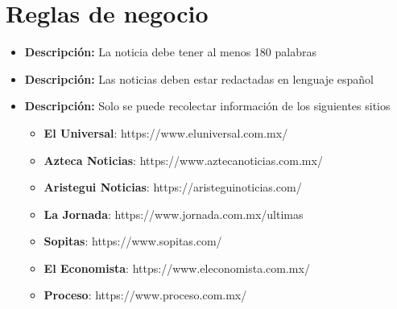 \section{Reglas de negocio}
\begin{itemize}
  \item \textbf{Descripción:}  La noticia debe tener al menos 180 palabras
\end{itemize}


\begin{itemize}
  \item \textbf{Descripción:} Las noticias deben estar redactadas en lenguaje español
\end{itemize}

\begin{itemize}
  \item \textbf{Descripción:} Solo se puede recolectar información de los siguientes sitios\\

  \begin{itemize}

    \item \textbf{El Universal}: https://www.eluniversal.com.mx/
    \item \textbf{Azteca Noticias}: https://www.aztecanoticias.com.mx/
    \item \textbf{Aristegui Noticias}: https://aristeguinoticias.com/
    \item \textbf{La Jornada}: https://www.jornada.com.mx/ultimas
    \item \textbf{Sopitas}: https://www.sopitas.com/
    \item \textbf{El Economista}: https://www.eleconomista.com.mx/
    \item \textbf{Proceso}: https://www.proceso.com.mx/

  \end{itemize} 
\end{itemize}


